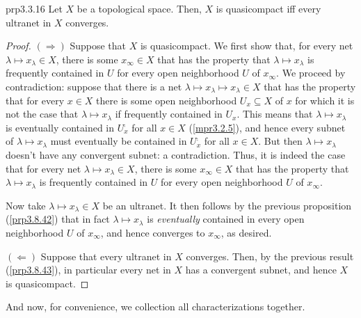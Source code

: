\begin{prp}{}{prp3.3.16}
Let $X$ be a topological space.  Then, $X$ is quasicompact iff every ultranet in $X$ converges.
\begin{proof}
$(\Rightarrow )$ Suppose that $X$ is quasicompact.  We first show that, for every net $\lambda \mapsto x_{\lambda}\in X$, there is some $x_{\infty}\in X$ that has the property that $\lambda \mapsto x_{\lambda}$ is frequently contained in $U$ for every open neighborhood $U$ of $x_{\infty}$.  We proceed by contradiction:  suppose that there is a net $\lambda \mapsto x_{\lambda}\mapsto x_{\lambda}\in X$ that has the property that for every $x\in X$ there is some open neighborhood $U_x\subseteq X$ of $x$ for which it is not the case that $\lambda \mapsto x_{\lambda}$ if frequently contained in $U_x$.  This means that $\lambda \mapsto x_{\lambda}$ is eventually contained in $U_x^{\comp}$ for all $x\in X$ (\cref{mpr3.2.5}), and hence every subnet of $\lambda \mapsto x_{\lambda}$ must eventually be contained in $U_x^{\comp}$ for all $x\in X$.  But then $\lambda \mapsto x_{\lambda}$ doesn't have any convergent subnet:  a contradiction.  Thus, it is indeed the case that for every net $\lambda \mapsto x_{\lambda}\in X$, there is some $x_{\infty}\in X$ that has the property that $\lambda \mapsto x_{\lambda}$ is frequently contained in $U$ for every open neighborhood $U$ of $x_{\infty}$.

Now take $\lambda \mapsto x_{\lambda}\in X$ be an ultranet.  It then follows by the previous proposition (\cref{prp3.8.42}) that in fact $\lambda \mapsto x_{\lambda}$ is \emph{eventually} contained in every open neighborhood $U$ of $x_{\infty}$, and hence converges to $x_{\infty}$, as desired.

\blankline
\noindent
$(\Leftarrow )$ Suppose that every ultranet in $X$ converges.  Then, by the previous result (\cref{prp3.8.43}), in particular every net in $X$ has a convergent subnet, and hence $X$ is quasicompact.
\end{proof}
\end{prp}
And now, for convenience, we collection all characterizations together.
